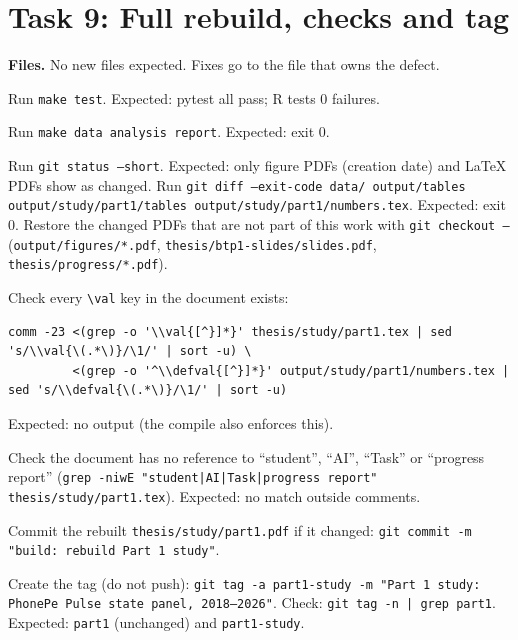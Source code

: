 \documentclass[10pt,a4paper]{article}
\newcommand{\f}[1]{\texttt{#1}}
\begin{document}
\section{Task 9: Full rebuild, checks and tag}
\textbf{Files.} No new files expected. Fixes go to the file that owns the defect.

\begin{steps}
\item Run \f{make test}. Expected: pytest all pass; R tests 0 failures.
\item Run \f{make data analysis report}. Expected: exit 0.
\item Run \f{git status --short}. Expected: only figure PDFs (creation date) and LaTeX PDFs show as changed. Run
      \f{git diff --exit-code data/ output/tables output/study/part1/tables output/study/part1/numbers.tex}.
      Expected: exit 0. Restore the changed PDFs that are not part of this work with \f{git checkout --}
      (\f{output/figures/*.pdf}, \f{thesis/btp1-slides/slides.pdf}, \f{thesis/progress/*.pdf}).
\item Check every \verb|\val| key in the document exists:
\begin{verbatim}
comm -23 <(grep -o '\\val{[^}]*}' thesis/study/part1.tex | sed 's/\\val{\(.*\)}/\1/' | sort -u) \
         <(grep -o '^\\defval{[^}]*}' output/study/part1/numbers.tex | sed 's/\\defval{\(.*\)}/\1/' | sort -u)
\end{verbatim}
      Expected: no output (the compile also enforces this).
\item Check the document has no reference to ``student'', ``AI'', ``Task'' or ``progress report''
      (\f{grep -niwE "student|AI|Task|progress report" thesis/study/part1.tex}). Expected: no match outside comments.
\item Commit the rebuilt \f{thesis/study/part1.pdf} if it changed:
      \f{git commit -m "build: rebuild Part 1 study"}.
\item Create the tag (do not push): \f{git tag -a part1-study -m "Part 1 study: PhonePe Pulse state panel, 2018--2026"}.
      Check: \f{git tag -n | grep part1}. Expected: \f{part1} (unchanged) and \f{part1-study}.
\end{steps}
\end{document}
